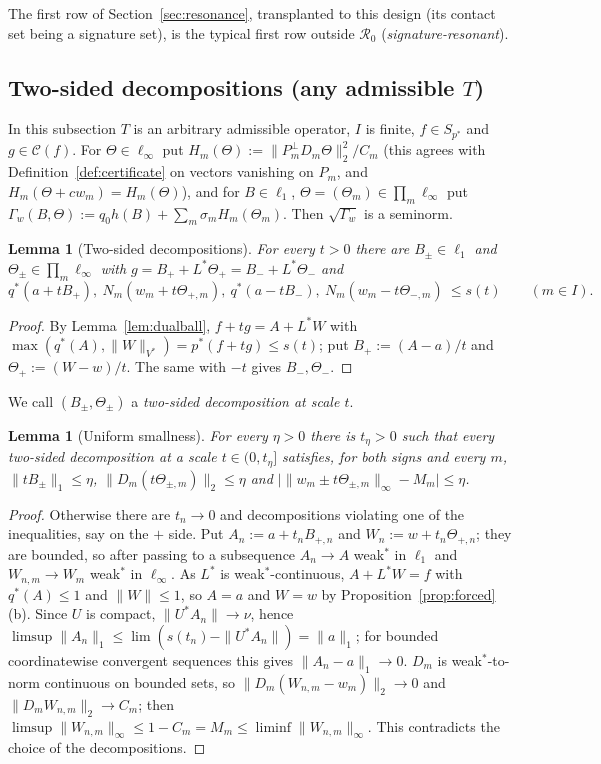 \documentclass[10pt]{amsart}
\newtheorem{lemma}[theorem]{Lemma}
\theoremstyle{definition}
\theoremstyle{remark}
\newcommand{\Cset}{\mathcal C}
\begin{document}
The first row of Section~\ref{sec:resonance}, transplanted to this design
(its contact set being a signature set), is the typical first row outside
$\mathcal R_0$ (\emph{signature-resonant}).

\subsection{Two-sided decompositions (any admissible $T$)}
In this subsection $T$ is an arbitrary admissible operator, $I$ is finite,
$f\in S_{p^*}$ and $g\in\Cset(f)$.  For $\Theta\in\ell_\infty$ put
$H_m(\Theta):=\|P_m^\perp D_m\Theta\|_2^2/C_m$ (this agrees with
Definition~\ref{def:certificate} on vectors vanishing on $P_m$, and
$H_m(\Theta+cw_m)=H_m(\Theta)$), and for $B\in\ell_1$,
$\Theta=(\Theta_m)\in\prod_m\ell_\infty$ put $\Gamma_w(B,\Theta):=q_0h(B)+
\sum_m\sigma_mH_m(\Theta_m)$.  Then $\sqrt{\Gamma_w}$ is a seminorm.

\begin{lemma}[Two-sided decompositions]\label{lem:twosided}
For every $t>0$ there are $B_\pm\in\ell_1$ and $\Theta_\pm\in\prod_m
\ell_\infty$ with $g=B_++L^*\Theta_+=B_-+L^*\Theta_-$ and
\[
 q^*(a+tB_+),\ N_m(w_m+t\Theta_{+,m}),\ q^*(a-tB_-),\ N_m(w_m-t\Theta_{-,m})
 \ \le s(t)\qquad(m\in I).
\]
\end{lemma}

\begin{proof}
By Lemma~\ref{lem:dualball}, $f+tg=A+L^*W$ with $\max(q^*(A),\|W\|_{V^*})=
p^*(f+tg)\le s(t)$; put $B_+:=(A-a)/t$ and $\Theta_+:=(W-w)/t$.  The same
with $-t$ gives $B_-,\Theta_-$.
\end{proof}

We call $(B_\pm,\Theta_\pm)$ a \emph{two-sided decomposition at scale $t$}.

\begin{lemma}[Uniform smallness]\label{lem:smallness}
For every $\eta>0$ there is $t_\eta>0$ such that every two-sided
decomposition at a scale $t\in(0,t_\eta]$ satisfies, for both signs and
every $m$, $\|tB_\pm\|_1\le\eta$, $\|D_m(t\Theta_{\pm,m})\|_2\le\eta$ and
$\big|\|w_m\pm t\Theta_{\pm,m}\|_\infty-M_m\big|\le\eta$.
\end{lemma}

\begin{proof}
Otherwise there are $t_n\to0$ and decompositions violating one of the
inequalities, say on the $+$ side.  Put $A_n:=a+t_nB_{+,n}$ and
$W_n:=w+t_n\Theta_{+,n}$; they are bounded, so after passing to a
subsequence $A_n\to A$ weak$^*$ in $\ell_1$ and $W_{n,m}\to W_m$ weak$^*$ in
$\ell_\infty$.  As $L^*$ is weak$^*$-continuous, $A+L^*W=f$ with
$q^*(A)\le1$ and $\|W\|\le1$, so $A=a$ and $W=w$ by
Proposition~\ref{prop:forced}(b).  Since $U$ is compact, $\|U^*A_n\|\to\nu$,
hence $\limsup\|A_n\|_1\le\lim(s(t_n)-\|U^*A_n\|)=\|a\|_1$; for bounded
coordinatewise convergent sequences this gives $\|A_n-a\|_1\to0$.  $D_m$ is
weak$^*$-to-norm continuous on bounded sets, so $\|D_m(W_{n,m}-w_m)\|_2\to0$
and $\|D_mW_{n,m}\|_2\to C_m$; then $\limsup\|W_{n,m}\|_\infty\le
1-C_m=M_m\le\liminf\|W_{n,m}\|_\infty$.  This contradicts the choice of the
decompositions.
\end{proof}
\end{document}
